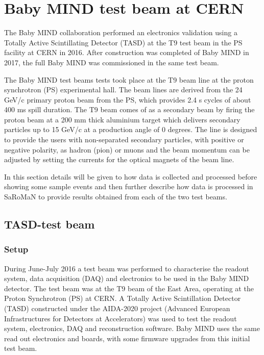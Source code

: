 \chapter{Baby MIND test beam at CERN}
\label{c:Testbeam}

The Baby MIND collaboration performed an electronics validation using a Totally Active Scintillating Detector (TASD) at the T9 test beam in the PS facility at CERN in 2016. After construction was completed of Baby MIND in 2017, the full Baby MIND was commissioned in the same test beam.

The Baby MIND test beams tests took place at the T9 beam line at the proton synchrotron (PS) experimental hall. The beam lines are derived from the 24 GeV/c primary proton beam from the PS, which provides 2.4 s cycles of about 400 ms spill duration. The T9 beam comes of as a secondary beam by firing the proton beam at a 200 mm thick aluminium target which delivers secondary particles up to 15 GeV/c at a production angle of 0 degrees. The line is designed to provide the users with non-separated secondary particles, with positive or negative polarity, as hadron (pion) or muons and the beam momentum can be adjusted by setting the currents for the optical magnets of the beam line.

In this section details will be given to how data is collected and processed before showing some sample events and then further describe how data is processed in SaRoMaN to provide results obtained from each of the two test beams.


\section{TASD-test beam}

\subsection{Setup}
During June-July 2016 a test beam was performed to characterise the readout system, data acquisition (DAQ) and electronics to be used in the Baby MIND detector. The test beam was at the T9 beam of the East Area, operating at the Proton Synchrotron (PS) at CERN. A Totally Active Scintillation Detector (TASD) constructed under the AIDA-2020 project (Advanced European Infrastructures for Detectors at Accelerators) was used to test the readout system, electronics, DAQ and reconstruction software. Baby MIND uses the same read out electronics and boards, with some firmware upgrades from this initial test beam.

